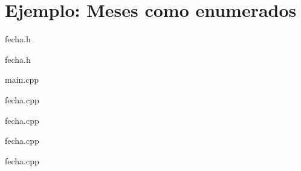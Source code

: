 \section{Ejemplo: Meses como enumerados}

\begin{frame}
\begin{block}{fecha.h}

\end{block}
\end{frame}

\begin{frame}
\begin{block}{fecha.h}

\end{block}
\end{frame}

\begin{frame}
\begin{block}{main.cpp}

\end{block}
\end{frame}

\begin{frame}
\begin{block}{fecha.cpp}

\end{block}
\end{frame}

\begin{frame}
\begin{block}{fecha.cpp}

\end{block}
\end{frame}

\begin{frame}
\begin{block}{fecha.cpp}

\end{block}
\end{frame}

\begin{frame}
\begin{block}{fecha.cpp}

\end{block}
\end{frame}




